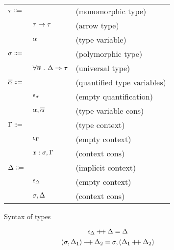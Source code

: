 \documentclass[acmlarge]{acmart}
\begin{document}
  \begin{figure}[h!]
    \begin{mdframed}

      \begin{tabular}{l l l}
        $\tau \Coloneqq$ & & (monomorphic type) \\
        & $\tau \rightarrow \tau$ & (arrow type) \\
        & $\alpha$ & (type variable) \\
        $\sigma \Coloneqq$ & & (polymorphic type) \\
        & $\forall \overline{\alpha} \ . \ \Delta \Rightarrow \tau$ & (universal type) \\
        $\overline{\alpha} \Coloneqq$ & & (quantified type variables) \\
        & $\epsilon_{\sigma}$ & (empty quantification) \\
        & $\alpha, \overline{\alpha}$ & (type variable cons) \\
        $\Gamma \Coloneqq$ & & (type context) \\
        & $\epsilon_{\Gamma}$ & (empty context) \\
        & $x : \sigma, \Gamma$ & (context cons) \\
        $\Delta \Coloneqq$ & & (implicit context) \\
        & $\epsilon_{\Delta}$ & (empty context) \\
        & $\sigma, \Delta$ & (context cons)
      \end{tabular}

    \end{mdframed}
    \caption{Syntax of types}
    \label{fig:types_syntax}
  \end{figure}

  \[ \epsilon_{\Delta} \mathbin{+\!+} \Delta = \Delta \]
  \[ \left(\sigma, \Delta_1\right) \mathbin{+\!+} \Delta_2 = \sigma, \left(\Delta_1 \mathbin{+\!+} \Delta_2\right) \]
\end{document}
